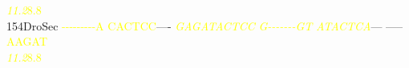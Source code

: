 \documentclass[11pt,twoside,reqno,a4paper]{article}
\begin{document}
{\hspace*{4\charwidth}\hspace*{7\charwidth}\hspace*{1\charwidth}\hspace*{1\charwidth}\hspace*{20\charwidth}\textit{\textcolor{Yellow}{11.2}}\hspace*{1\charwidth}\hspace*{1\charwidth}\hspace*{1\charwidth}\hspace*{31\charwidth}\textcolor{Yellow}{8.8}\hspace*{1\charwidth}\\
154\hspace*{1\charwidth}DroSec	\textcolor{Yellow}{-}\textcolor{Yellow}{-}\textcolor{Yellow}{-}\textcolor{Yellow}{-}\textcolor{Yellow}{-}\textcolor{Yellow}{-}\textcolor{Yellow}{-}\textcolor{Yellow}{-}\textcolor{Yellow}{-}\textcolor{Yellow}{A}	\textcolor{Yellow}{C}\textcolor{Yellow}{A}\textcolor{Yellow}{C}\textcolor{Yellow}{T}\textcolor{Yellow}{C}\textcolor{Yellow}{C}----	\textit{\textcolor{Yellow}{G}}\textit{\textcolor{Yellow}{A}}\textit{\textcolor{Yellow}{G}}\textit{\textcolor{Yellow}{A}}\textit{\textcolor{Yellow}{T}}\textit{\textcolor{Yellow}{A}}\textit{\textcolor{Yellow}{C}}\textit{\textcolor{Yellow}{T}}\textit{\textcolor{Yellow}{C}}\textit{\textcolor{Yellow}{C}}	\textit{\textcolor{Yellow}{G}}\textit{\textcolor{Yellow}{-}}\textit{\textcolor{Yellow}{-}}\textit{\textcolor{Yellow}{-}}\textit{\textcolor{Yellow}{-}}\textit{\textcolor{Yellow}{-}}\textit{\textcolor{Yellow}{-}}\textit{\textcolor{Yellow}{-}}\textit{\textcolor{Yellow}{G}}\textit{\textcolor{Yellow}{T}}	\textit{\textcolor{Yellow}{A}}\textit{\textcolor{Yellow}{T}}\textit{\textcolor{Yellow}{A}}\textit{\textcolor{Yellow}{C}}\textit{\textcolor{Yellow}{T}}\textit{\textcolor{Yellow}{C}}\textit{\textcolor{Yellow}{A}}---	-----\textcolor{Yellow}{A}\textcolor{Yellow}{A}\textcolor{Yellow}{G}\textcolor{Yellow}{A}\textcolor{Yellow}{T}	\\
\hspace*{4\charwidth}\hspace*{7\charwidth}\hspace*{1\charwidth}\hspace*{1\charwidth}\hspace*{20\charwidth}\textit{\textcolor{Yellow}{11.2}}\hspace*{1\charwidth}\hspace*{1\charwidth}\hspace*{1\charwidth}\hspace*{31\charwidth}\textcolor{Yellow}{8.8}\hspace*{1\charwidth}\\
}
\end{document}
